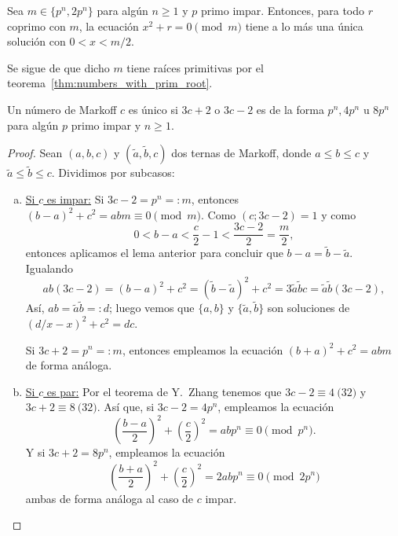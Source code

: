 \documentclass[teoria-numeros.tex]{subfiles}
\begin{document}
\begin{lem}
	Sea $m \in \{ p^n, 2p^n \}$ para algún $n \ge 1$ y $p$ primo impar.
	Entonces, para todo $r$ coprimo con $m$, la ecuación $x^2 + r = 0 \pmod m$ tiene a lo más una única solución con $0 < x < m/2$.
\end{lem}
\begin{hint}
	Se sigue de que dicho $m$ tiene raíces primitivas por el teorema~\ref{thm:numbers_with_prim_root}.
\end{hint}

\begin{thm}
	Un número de Markoff $c$ es único si $3c + 2$ o $3c - 2$ es de la forma $p^n, 4p^n$ u $8p^n$
	para algún $p$ primo impar y $n \ge 1$.
\end{thm}
\begin{proof}
	Sean $(a, b, c)$ y $(\tilde a, \tilde b, c)$ dos ternas de Markoff, donde $a \le b \le c$ y $\tilde a \le \tilde b \le c$.
	Dividimos por subcasos:
	\begin{enumerate}[(a)]
		\item \underline{Si $c$ es impar:} 
			Si $3c - 2 = p^n =: m$, entonces $(b - a)^2 + c^2 = abm \equiv 0 \pmod{m}$.
			Como $(c; 3c - 2) = 1$ y como
			$$ 0 < b-a < \frac{c}{2} - 1 < \frac{3c - 2}{2} = \frac{m}{2}, $$
			entonces aplicamos el lema anterior para concluir que $b - a = \tilde b - \tilde a$.
			Igualando
			\[
				ab(3c - 2) = (b - a)^2 + c^2 = (\tilde b - \tilde a)^2 + c^2 = 3\tilde a\tilde b c = \tilde a\tilde b(3c - 2),
			\]
			Así, $ab = \tilde a\tilde b =: d$; luego vemos que $\{ a, b \}$ y $\{ \tilde a, \tilde b \}$ son soluciones
			de $(d/x - x)^2 + c^2 = dc$.

			Si $3c + 2 = p^n =: m$, entonces empleamos la ecuación $(b + a)^2 + c^2 = abm$ de forma análoga.

		\item \underline{Si $c$ es par:}
			Por el teorema de Y.~Zhang tenemos que $3c - 2 \equiv 4 \pod{32}$ y $3c + 2 \equiv 8 \pod{32}$.
			Así que, si $3c - 2 = 4p^n$, empleamos la ecuación
			$$ \left( \frac{b - a}{2} \right)^2 + \left( \frac{c}{2} \right)^2 = abp^n \equiv 0 \pmod{p^n}. $$
			Y si $3c + 2 = 8p^n$, empleamos la ecuación
			$$ \left( \frac{b + a}{2} \right)^2 + \left( \frac{c}{2} \right)^2 = 2abp^n \equiv 0 \pmod{2p^n} $$
			ambas de forma análoga al caso de $c$ impar. \qedhere
	\end{enumerate}
\end{proof}
\end{document}
